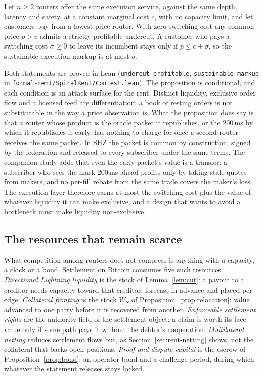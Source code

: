 \begin{proposition}
\label{prop:contest}
Let $n\ge 2$ routers offer the same execution service, against the same depth, latency and safety, at a constant marginal cost $c$, with no capacity limit, and let customers buy from a lowest-price router. With zero switching cost any common price $p>c$ admits a strictly profitable undercut. A customer who pays a switching cost $\sigma\ge 0$ to leave its incumbent stays only if $p\le c+\sigma$, so the sustainable execution markup is at most $\sigma$.
\end{proposition}

Both statements are proved in Lean (\texttt{undercut\_\allowbreak{}profitable}, \texttt{sustainable\_\allowbreak{}markup} in \texttt{formal-rent/\allowbreak{}SpiralRent/\allowbreak{}Contest.lean}). The proposition is conditional, and each condition is an attack surface for the rent. Distinct liquidity, exclusive order flow and a licensed feed are differentiation; a book of resting orders is not substitutable in the way a price observation is. What the proposition does say is that a router whose product is the oracle packet it republishes, or the 200\,ms by which it republishes it early, has nothing to charge for once a second router receives the same packet. In SHZ the packet is common by construction, signed by the federation and released to every subscriber under the same terms. The companion study adds that even the early packet's value is a transfer: a subscriber who sees the mark 200\,ms ahead profits only by taking stale quotes from makers, and no per-fill rebate from the same trade covers the maker's loss. The execution layer therefore earns at most the switching cost plus the value of whatever liquidity it can make exclusive, and a design that wants to avoid a bottleneck must make liquidity non-exclusive.

\subsection{The resources that remain scarce}
\label{sec:rent-scarce}

What competition among routers does not compress is anything with a capacity, a clock or a bond. Settlement on Bitcoin consumes five such resources. \emph{Directional Lightning liquidity} is the stock of Lemma~\ref{lem:cut}: a payout to a creditor needs capacity toward that creditor, forecast in advance and placed per edge. \emph{Collateral fronting} is the stock $W_S$ of Proposition~\ref{prop:relocation}: value advanced to one party before it is recovered from another. \emph{Enforceable settlement rights} are the authority field of the settlement object: a claim is worth its face value only if some path pays it without the debtor's cooperation. \emph{Multilateral netting} reduces settlement flows \citep{duffie2011ccp} but, as Section~\ref{sec:rent-netting} shows, not the collateral that backs open positions. \emph{Proof and dispute capital} is the escrow of Proposition~\ref{prop:bond}: an operator bond and a challenge period, during which whatever the statement releases stays locked.

